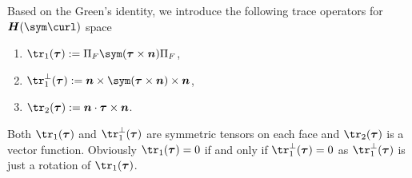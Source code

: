 Based on the Green's identity, we introduce the following trace operators for $\boldsymbol H(\sym\curl)$ space
\begin{enumerate}
\item $\tr_1(\boldsymbol \tau) := \Pi_F \sym (\boldsymbol\tau\times\boldsymbol n)\Pi_F$,

 \item $\tr_1^{\bot}(\boldsymbol \tau) := \boldsymbol n \times \sym (\boldsymbol\tau\times\boldsymbol n)\times \boldsymbol n$,

 \item $\tr_2(\boldsymbol \tau) := \boldsymbol n\cdot \boldsymbol \tau\times\boldsymbol n$.
\end{enumerate}
Both $\tr_1(\boldsymbol \tau)$ and $\tr_1^{\bot}(\boldsymbol \tau)$ are symmetric tensors on each face and $\tr_2(\boldsymbol \tau)$ is a vector function. Obviously $\tr_1(\boldsymbol \tau) = 0$ if and only if  $\tr_1^{\bot}(\boldsymbol \tau) = 0$  as   $\tr_1^{\bot}(\boldsymbol \tau)$ is just a rotation of $\tr_1(\boldsymbol \tau)$.
%
%
%
